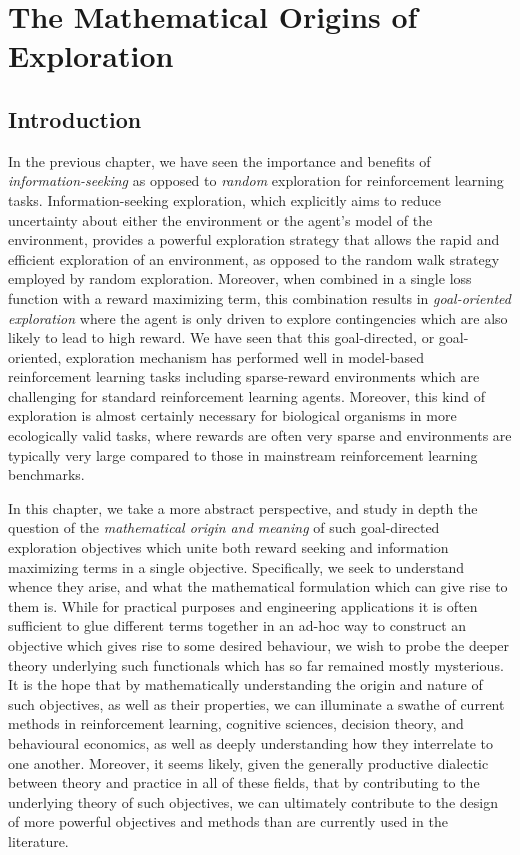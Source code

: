 
\chapter{The Mathematical Origins of Exploration}

\section{Introduction} 

In the previous chapter, we have seen the importance and benefits of \emph{information-seeking} as opposed to \emph{random} exploration for reinforcement learning tasks. Information-seeking exploration, which explicitly aims to reduce uncertainty about either the environment or the agent's model of the environment, provides a powerful exploration strategy that allows the rapid and efficient exploration of an environment, as opposed to the random walk strategy employed by random exploration. Moreover, when combined in a single loss function with a reward maximizing term, this combination results in \emph{goal-oriented exploration} where the agent is only driven to explore contingencies which are also likely to lead to high reward. We have seen that this goal-directed, or goal-oriented, exploration mechanism has performed well in model-based reinforcement learning tasks including sparse-reward environments which are challenging for standard reinforcement learning agents. Moreover, this kind of exploration is almost certainly necessary for biological organisms in more ecologically valid tasks, where rewards are often very sparse and environments are typically very large compared to those in mainstream reinforcement learning benchmarks.

In this chapter, we take a more abstract perspective, and study in depth the question of the \emph{mathematical origin and meaning} of such goal-directed exploration objectives which unite both reward seeking and information maximizing terms in a single objective. Specifically, we seek to understand whence they arise, and what the mathematical formulation which can give rise to them is. While for practical purposes and engineering applications it is often sufficient to glue different terms together in an ad-hoc way to construct an objective which gives rise to some desired behaviour, we wish to probe the deeper theory underlying such functionals which has so far remained mostly mysterious. It is the hope that by mathematically understanding the origin and nature of such objectives, as well as their properties, we can illuminate a swathe of current methods in reinforcement learning, cognitive sciences, decision theory, and behavioural economics, as well as deeply understanding how they interrelate to one another. Moreover, it seems likely, given the generally productive dialectic between theory and practice in all of these fields, that by contributing to the underlying theory of such objectives, we can ultimately contribute to the design of more powerful objectives and methods than are currently used in the literature.

